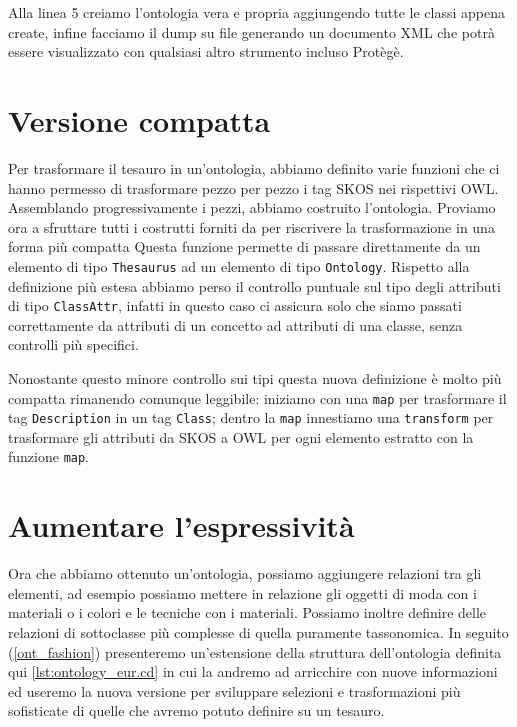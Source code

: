 Alla linea 5 creiamo l'ontologia vera e propria aggiungendo tutte le classi appena create, infine facciamo il dump su file generando un documento XML che potrà essere visualizzato con qualsiasi altro strumento incluso Protègè.
\section{Versione compatta}
Per trasformare il tesauro in un'ontologia, abbiamo definito varie funzioni che ci hanno permesso di trasformare pezzo per pezzo i tag SKOS nei rispettivi OWL. Assemblando progressivamente i pezzi, abbiamo costruito l'ontologia. Proviamo ora a sfruttare tutti i costrutti forniti da \cduce per riscrivere la trasformazione in una forma più compatta
Questa funzione permette di passare direttamente da un elemento di tipo \verb|Thesaurus| ad un elemento di tipo \verb|Ontology|. Rispetto alla definizione più estesa abbiamo perso il controllo puntuale sul tipo degli attributi di tipo \verb|ClassAttr|, infatti in questo caso \cduce ci assicura solo che siamo passati correttamente da attributi di un concetto ad attributi di una classe, senza controlli più specifici.

Nonostante questo minore controllo sui tipi questa nuova definizione è molto più compatta rimanendo comunque leggibile: iniziamo con una \verb|map| per trasformare il tag \verb|Description| in un tag \verb|Class|; dentro la \verb|map| innestiamo una \verb|transform| per trasformare gli attributi da SKOS a OWL per ogni elemento estratto con la funzione \verb|map|.

\section{Aumentare l'espressività}\label{expr}
Ora che abbiamo ottenuto un'ontologia, possiamo aggiungere relazioni tra gli elementi, ad esempio possiamo mettere in relazione gli oggetti di moda con i materiali o i colori e le tecniche con i materiali. Possiamo inoltre definire delle relazioni di sottoclasse più complesse di quella puramente tassonomica.  In seguito (\ref{ont_fashion}) presenteremo un'estensione della struttura dell'ontologia definita qui \ref{lst:ontology_eur.cd} in cui la andremo ad arricchire con nuove informazioni ed useremo la nuova versione per sviluppare selezioni e trasformazioni più sofisticate di quelle che avremo potuto definire su un tesauro.

